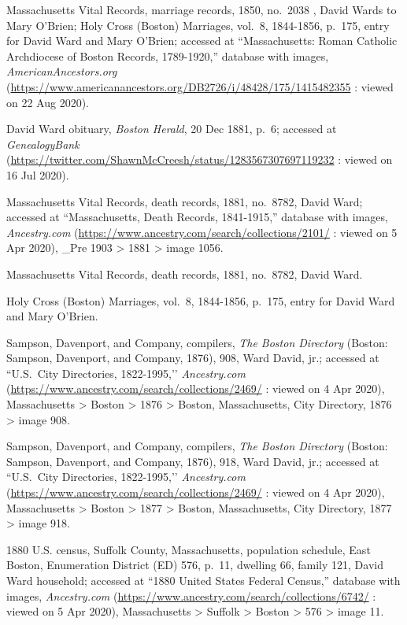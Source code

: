 \begin{thebibliography}{999}
Massachusetts Vital Records, marriage records, 1850, no.\ 2038 , David Wards to Mary O'Brien; Holy Cross (Boston) Marriages, vol.\ 8, 1844-1856, p.\ 175, entry for David Ward and Mary O'Brien; accessed at ``Massachusetts: Roman Catholic Archdiocese of Boston Records, 1789-1920,'' database with images, \textit{AmericanAncestors.org} (\url{https://www.americanancestors.org/DB2726/i/48428/175/1415482355} : viewed on 22 Aug 2020).

David Ward obituary, \textit{Boston Herald}, 20 Dec 1881, p.\ 6; accessed at \textit{GenealogyBank} (\url{https://twitter.com/ShawnMcCreesh/status/1283567307697119232} : viewed on 16 Jul 2020).

Massachusetts Vital Records, death records, 1881, no.\ 8782, David Ward; accessed at ``Massachusetts, Death Records, 1841-1915,'' database with images, \textit{Ancestry.com} (\url{https://www.ancestry.com/search/collections/2101/} : viewed on 5 Apr 2020), \_Pre 1903 > 1881 > image 1056.

Massachusetts Vital Records, death records, 1881, no.\ 8782, David Ward.

Holy Cross (Boston) Marriages, vol.\ 8, 1844-1856, p.\ 175, entry for David Ward and Mary O'Brien.

Sampson, Davenport, and Company, compilers, \textit{The Boston Directory} (Boston: Sampson, Davenport, and Company, 1876), 908, Ward David, jr.; accessed at ``U.S.\ City Directories, 1822-1995,’’ \textit{Ancestry.com} (\url{https://www.ancestry.com/search/collections/2469/} : viewed on 4 Apr 2020), Massachusetts > Boston > 1876 > Boston, Massachusetts, City Directory, 1876 > image 908.

Sampson, Davenport, and Company, compilers, \textit{The Boston Directory} (Boston: Sampson, Davenport, and Company, 1876), 918, Ward David, jr.; accessed at ``U.S.\ City Directories, 1822-1995,’’ \textit{Ancestry.com} (\url{https://www.ancestry.com/search/collections/2469/} : viewed on 4 Apr 2020), Massachusetts > Boston > 1877 > Boston, Massachusetts, City Directory, 1877 > image 918.

1880 U.S. census, Suffolk County, Massachusetts, population schedule, East Boston, Enumeration District (ED) 576, p.\ 11, dwelling 66, family 121, David Ward household; accessed at ``1880 United States Federal Census,'' database with images, \textit{Ancestry.com} (\url{https://www.ancestry.com/search/collections/6742/} : viewed on 5 Apr 2020), Massachusetts > Suffolk > Boston > 576 > image 11.


\end{thebibliography}
